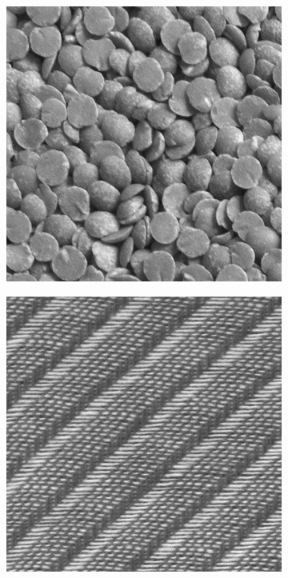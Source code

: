 \begin{figure}[H]
\begin{subfigure}{.15\textwidth}
  \includegraphics[width=.8\linewidth]{kylberg_examples/lentils1_002.png}
\end{subfigure}
\begin{subfigure}{.15\textwidth}
  \centering
  \includegraphics[width=.8\linewidth]{kylberg_examples/screen1_002.png}
\end{subfigure}


\end{figure}
